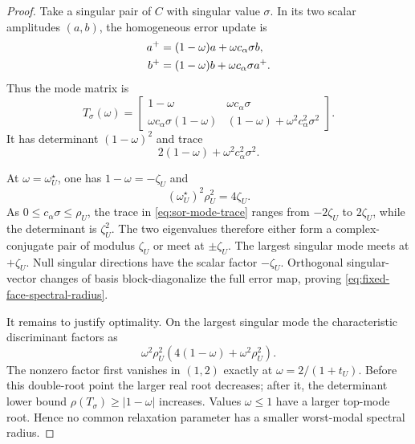 \begin{proof}
Take a singular pair of $C$ with singular value $\sigma$.  In its two scalar
amplitudes $(a,b)$, the homogeneous error update is
\begin{align}
 a^+&=(1-\omega)a+\omega c_\alpha\sigma b,
 \notag\\
 b^+&=(1-\omega)b+\omega c_\alpha\sigma a^+.
 \label{eq:sor-singular-mode-update}
\end{align}
Thus the mode matrix is
\begin{equation}
 T_\sigma(\omega)=
 \begin{bmatrix}
 1-\omega&\omega c_\alpha\sigma\\
 \omega c_\alpha\sigma(1-\omega)&
 (1-\omega)+\omega^2c_\alpha^2\sigma^2
 \end{bmatrix}.
 \label{eq:sor-mode-matrix}
\end{equation}
It has determinant $(1-\omega)^2$ and trace
\begin{equation}
 2(1-\omega)+\omega^2c_\alpha^2\sigma^2.
 \label{eq:sor-mode-trace}
\end{equation}

At $\omega=\omega_U^\star$, one has
$1-\omega=-\zeta_U$ and
\begin{equation}
 (\omega_U^\star)^2\rho_U^2=4\zeta_U.
 \label{eq:sor-optimal-identity}
\end{equation}
As $0\leq c_\alpha\sigma\leq\rho_U$, the trace in
\eqref{eq:sor-mode-trace} ranges from $-2\zeta_U$ to $2\zeta_U$, while the
determinant is $\zeta_U^2$.  The two eigenvalues therefore either form a
complex-conjugate pair of modulus $\zeta_U$ or meet at
$\pm\zeta_U$.  The largest singular mode meets at $+\zeta_U$.
Null singular directions have the scalar factor $-\zeta_U$.  Orthogonal
singular-vector changes of basis block-diagonalize the full error map, proving
\eqref{eq:fixed-face-spectral-radius}.

It remains to justify optimality.  On the largest singular mode the
characteristic discriminant factors as
\begin{equation*}
 \omega^2\rho_U^2
 \left(4(1-\omega)+\omega^2\rho_U^2\right).
\end{equation*}
The nonzero factor first vanishes in $(1,2)$ exactly at
$\omega=2/(1+t_U)$.  Before this double-root point the larger real root
decreases; after it, the determinant lower bound
$\rho(T_\sigma)\geq|1-\omega|$ increases.  Values $\omega\leq1$ have a
larger top-mode root.  Hence no common relaxation parameter has a smaller
worst-modal spectral radius.


\end{proof}
